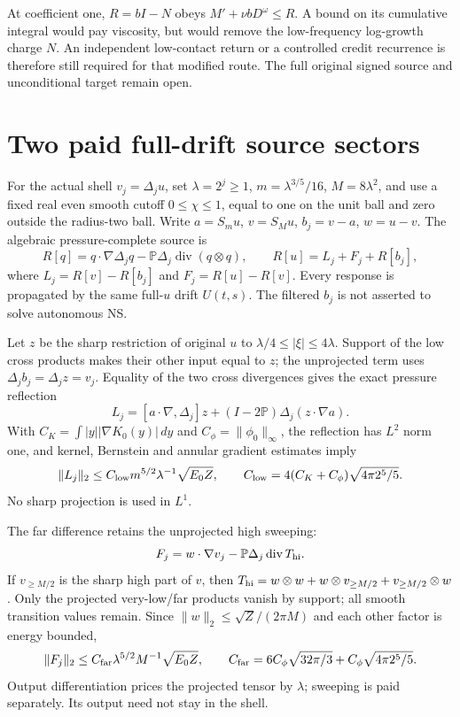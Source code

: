 \documentclass[11pt]{article}
\begin{document}
At coefficient one, $R=bI-N$ obeys
$M'+\nu bD^\omega\le R$. A bound on its cumulative integral would pay
viscosity, but would remove the low-frequency log-growth charge $N$.
An independent low-contact return or a controlled credit recurrence is
therefore still required for that modified route. The full original
signed source and unconditional target remain open.

\section{Two paid full-drift source sectors}
For the actual shell $v_j=\Delta_j u$, set $\lambda=2^j\ge1$,
$m=\lambda^{3/5}/16$, $M=8\lambda^2$, and use a fixed real even smooth
cutoff $0\le\chi\le1$, equal to one on the unit ball and zero outside
the radius-two ball. Write $a=S_m u$, $v=S_Mu$, $b_j=v-a$, $w=u-v$.
The algebraic pressure-complete source is
\[
 R[q]=q\cdot\nabla\Delta_jq-\mathbb P\Delta_j\operatorname{div}(q\otimes q),
 \qquad R[u]=L_j+F_j+R[b_j],
\]
where $L_j=R[v]-R[b_j]$ and $F_j=R[u]-R[v]$.
Every response is propagated by the same full-$u$ drift $U(t,s)$.
The filtered $b_j$ is not asserted to solve autonomous NS.

Let $z$ be the sharp restriction of original $u$ to
$\lambda/4\le|\xi|\le4\lambda$. Support of the low cross products makes
their other input equal to $z$; the unprojected term uses
$\Delta_j b_j=\Delta_j z=v_j$. Equality of the two cross divergences
gives the exact pressure reflection
\[
 L_j=[a\cdot\nabla,\Delta_j]z+(I-2\mathbb P)\Delta_j(z\cdot\nabla a).
\]
With $C_K=\int|y||\nabla K_0(y)|\,dy$ and
$C_\phi=\|\phi_0\|_\infty$, the reflection has $L^2$ norm one, and
kernel, Bernstein and annular gradient estimates imply
\[
 \|L_j\|_2\le C_{\rm low}m^{5/2}\lambda^{-1}\sqrt{E_0Z},\qquad
 C_{\rm low}=4(C_K+C_\phi)\sqrt{4\pi2^5/5}.
\]
No sharp projection is used in $L^1$.

The far difference retains the unprojected high sweeping:
\[
 F_j=w\cdot\nabla v_j-\mathbb P\Delta_j\operatorname{div}T_{\rm hi}.
\]
If $v_{\ge M/2}$ is the sharp high part of $v$, then
$T_{\rm hi}=w\otimes w+w\otimes v_{\ge M/2}+v_{\ge M/2}\otimes w$.
Only the projected very-low/far products vanish by support; all smooth
transition values remain. Since
$\|w\|_2\le\sqrt Z/(2\pi M)$ and each other factor is energy bounded,
\[
 \|F_j\|_2\le C_{\rm far}\lambda^{5/2}M^{-1}\sqrt{E_0Z},\qquad
 C_{\rm far}=6C_\phi\sqrt{32\pi/3}+C_\phi\sqrt{4\pi2^5/5}.
\]
Output differentiation prices the projected tensor by $\lambda$;
sweeping is paid separately. Its output need not stay in the shell.
\end{document}
